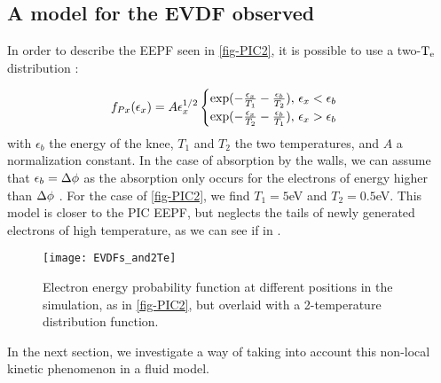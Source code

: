   \subsection{A model for the EVDF observed}
    \label{sec-twoTe}
    In order to describe the  EEPF seen in \cref{fig-PIC2}, it is possible to use a two-$\mathrm{T_e}$ distribution \citep{lafleur2011,mouchtouris2016, zhang2016}:

    \begin{equation}
      f_{Px}(\epsilon_x) = A \epsilon_x^{1/2}
    \begin{cases}
      \exp( - \frac{\epsilon_x}{T_1} -  \frac{\epsilon_b }{T_2}) , \, \epsilon_x < \epsilon_b \\
      \exp( - \frac{\epsilon_x}{T_2} - \frac{\epsilon_b }{T_1} ) , \, \epsilon_x > \epsilon_b
    \end{cases}
    \end{equation}
    with $\epsilon_b$ the energy of the knee, $T_1$ and $T_2$ the two temperatures, and $A$ a normalization constant.
    In the case of absorption by the walls, we can assume that $\epsilon_b = \Delta \phi$ as the absorption only occurs for the electrons of energy higher than $\Delta \phi$ .
    For the case of \cref{fig-PIC2}, we find $T_{1}=5$eV and $T_2=0.5$eV.
    This model is closer to the \ac{PIC} EEPF, but neglects the tails of newly generated electrons of high temperature, as we can see if in .


    \begin{figure}[hbtp]
      \centering
      \texttt{[image: EVDFs\_and2Te]}
      \caption{Electron energy probability function at different positions in the simulation, as in \cref{fig-PIC2}, but overlaid with a 2-temperature distribution function.}
      \label{fig-PIC3}
    \end{figure}

    In the next section, we investigate a way of taking into account this non-local kinetic phenomenon in a fluid model.
